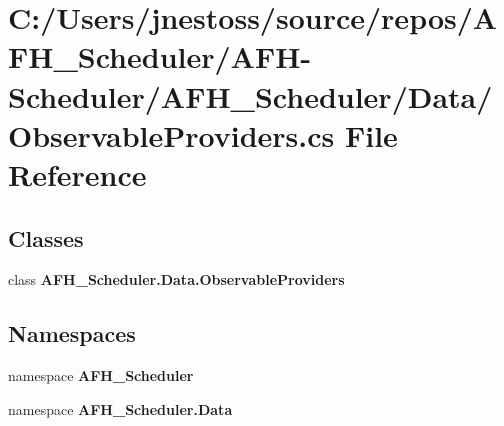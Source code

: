 \section{C\+:/\+Users/jnestoss/source/repos/\+A\+F\+H\+\_\+\+Scheduler/\+A\+F\+H-\/\+Scheduler/\+A\+F\+H\+\_\+\+Scheduler/\+Data/\+Observable\+Providers.cs File Reference}
\label{_observable_providers_8cs}
\subsection*{Classes}
\begin{DoxyCompactItemize}
\item 
class \textbf{ A\+F\+H\+\_\+\+Scheduler.\+Data.\+Observable\+Providers}
\end{DoxyCompactItemize}
\subsection*{Namespaces}
\begin{DoxyCompactItemize}
\item 
namespace \textbf{ A\+F\+H\+\_\+\+Scheduler}
\item 
namespace \textbf{ A\+F\+H\+\_\+\+Scheduler.\+Data}
\end{DoxyCompactItemize}
